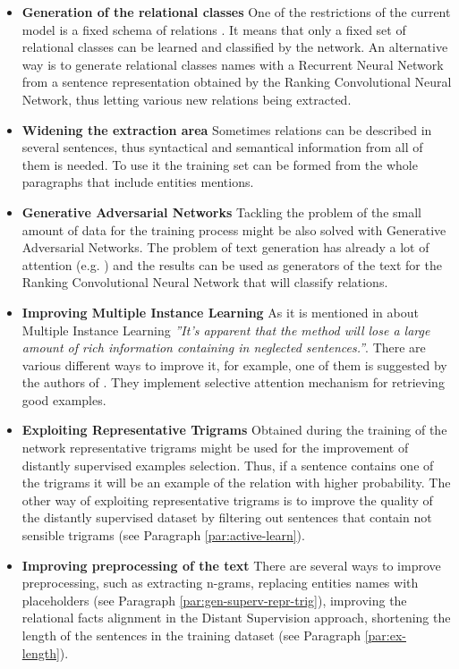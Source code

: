 \begin{itemize}
\item \textbf{Generation of the relational classes} One of the restrictions of the current model is a fixed 
schema of relations \cite{riedel2013relation}. It means that only a fixed set of relational classes 
can be learned and classified by the network. An alternative way is to generate relational classes
names with a Recurrent Neural Network from a sentence representation obtained by the Ranking Convolutional Neural Network, thus 
letting various new relations being extracted.

\item \textbf{Widening the extraction area} Sometimes relations can be described in several 
sentences, thus syntactical and semantical information from all of them is needed. To use it  
the training set can be formed from the whole paragraphs that include entities mentions.

\item \textbf{Generative Adversarial Networks} Tackling the problem of the small amount of data for the 
training process might be also solved with Generative Adversarial Networks. The problem of text generation 
has already a lot of attention (e.g. \cite{hu2017controllable}) and the results can be used as generators 
of the text for the Ranking Convolutional Neural Network that will classify relations.

\item \textbf{Improving Multiple Instance Learning}  As it is mentioned in \cite{lin2016neural} about Multiple Instance Learning \textit{''It's apparent  that  
the  method  will  lose  a  large  amount of  rich  information  containing  in  neglected  
sentences.''}. There are various different ways to improve it, for example, one of them is suggested by
the authors of \cite{lin2016neural}. They implement selective attention mechanism for retrieving good examples.

\item \textbf{Exploiting Representative Trigrams} Obtained during the training of the network 
representative trigrams might be used for the improvement of distantly supervised examples 
selection. Thus, if a sentence contains one of the trigrams it will be an example of the relation 
with higher probability. The other way of exploiting representative trigrams is to improve 
the quality of the distantly supervised dataset by filtering out sentences that contain not sensible trigrams 
(see Paragraph \ref{par:active-learn}).

\item \textbf{Improving preprocessing of the text} There are several ways to improve preprocessing, such as 
extracting n-grams, replacing entities names with placeholders (see Paragraph \ref{par:gen-superv-repr-trig}), 
improving the relational facts alignment in the 
Distant Supervision approach, shortening the length of the sentences in the training dataset (see Paragraph \ref{par:ex-length}).
\end{itemize}


